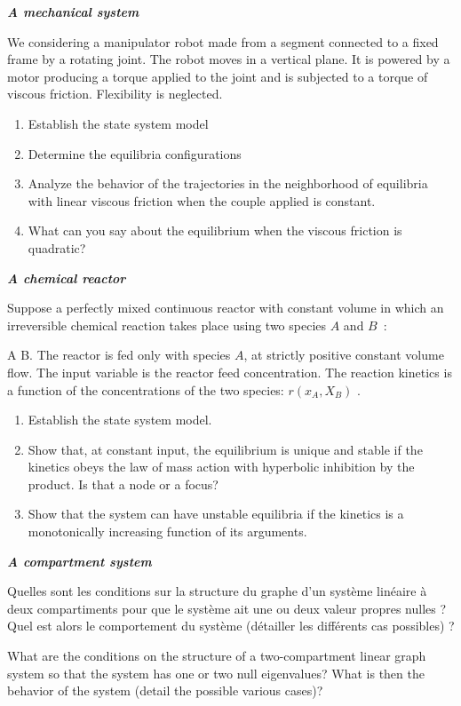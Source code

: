 \begin{exercice} {\bf \em A mechanical system}

We considering a manipulator robot made from a segment connected to a fixed frame by a rotating joint. 
The robot moves in a vertical plane. It is powered by a motor producing a torque
applied to the joint and is subjected to a torque of viscous friction. Flexibility is neglected.

\begin{enumerate}
\item Establish the state system model
\item Determine the equilibria configurations
\item Analyze the behavior of the trajectories in the neighborhood of
equilibria with linear viscous friction when the couple
applied is constant.
\item What can you say about the equilibrium when the viscous friction
is quadratic?
\end{enumerate}
\end{exercice}
\vv

\begin{exercice}{\bf \em A chemical reactor}

Suppose a perfectly mixed continuous reactor with constant volume 
in which an irreversible chemical reaction takes place 
using two species $A$ and $B$~:

\eqnn
A \longrightarrow B.
\eeqnn
The reactor is fed only with species $A$, at 
strictly positive constant volume flow. The input variable is
the reactor feed concentration. The reaction kinetics
is a function of the concentrations of the two species: $r(x_A,X_B)$ .

\begin{enumerate}
\item Establish the state system model.
\item Show that, at constant input, the equilibrium is unique and
stable if the kinetics obeys the law of mass action with hyperbolic inhibition
by the product. Is that a node or a focus?

\item Show that the system can have unstable equilibria 
if the kinetics is a monotonically increasing function of its
arguments.
\end{enumerate}
\end{exercice}
\vv

\begin{exercice} {\bf \em A compartment system}

Quelles sont les conditions sur la structure du graphe d'un
système linéaire à deux compartiments pour que le système ait
une ou deux valeur propres nulles ? Quel est alors le comportement du
système (détailler les différents cas possibles) ?

What are the conditions on the structure of a two-compartment linear graph system so that the system has
one or two null eigenvalues? What is then the behavior of the
system (detail the possible various cases)?

\end{exercice}
\vv

